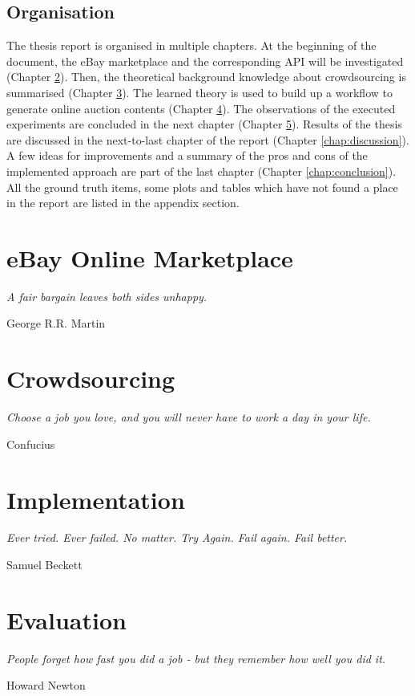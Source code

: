 \documentclass[a4paper]{report}
\begin{document}
\section{Organisation}
The thesis report is organised in multiple chapters. At the beginning of the document, the eBay marketplace and the corresponding API will be investigated (Chapter \ref{chap:ebay}). Then, the theoretical background knowledge about crowdsourcing is summarised (Chapter \ref{chap:crowdsourcing}). The learned theory is used to build up a workflow to generate online auction contents (Chapter \ref{chap:implementation}). The observations of the executed experiments are concluded in the next chapter (Chapter \ref{chap:evaluation}). Results of the thesis are discussed in the next-to-last chapter of the report (Chapter \ref{chap:discussion}). A few ideas for improvements and a summary of the pros and cons of the implemented approach are part of the last chapter (Chapter \ref{chap:conclusion}). All the ground truth items, some plots and tables which have not found a place in the report are listed in the appendix section.

\chapter{eBay Online Marketplace}
\label{chap:ebay}
\epigraph{\textit{A fair bargain leaves both sides unhappy.}}{George R.R. Martin}


\chapter{Crowdsourcing}
\label{chap:crowdsourcing}
\epigraph{\textit{Choose a job you love, and you will never have to work a day in your life.}}{Confucius}


\chapter{Implementation}
\label{chap:implementation}
\epigraph{\textit{Ever tried. Ever failed. No matter. Try Again. Fail again. Fail better.}}{Samuel Beckett}


\chapter{Evaluation}
\label{chap:evaluation}
\epigraph{\textit{People forget how fast you did a job - but they remember how well you did it.}}{Howard Newton}

\end{document}
